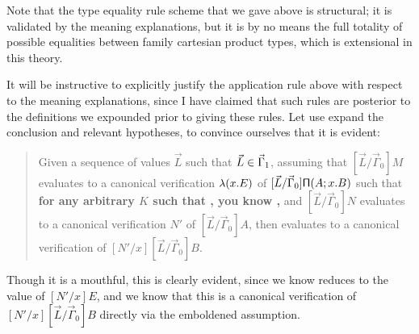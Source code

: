 \documentclass[main.tex]{subfiles}
\begin{document}
Note that the type equality rule scheme that we gave above is structural; it is
validated by the meaning explanations, but it is by no means the full totality
of possible equalities between family cartesian product types, which is
extensional in this theory.

It will be instructive to explicitly justify the application rule above with
respect to the meaning explanations, since I have claimed that such rules are
posterior to the definitions we expounded prior to giving these rules. Let use
expand the conclusion and relevant hypotheses, to convince ourselves that it is
evident:

\begin{quote}

  Given a sequence of values $\vec{L}$ such that $\vec{L}\in\vec\Gamma_1$,
  assuming that $[\vec{L}/\vec\Gamma_0]M$ evaluates to a canonical verification
  $\mathsf{\lambda}(x.E)$ of $[\vec{L}/\vec\Gamma_0]\mathsf{\Pi}(A;x.B)$ such that
  \textbf{for any arbitrary $K$ such that
  , you know
  ,} and $[\vec{L}/\vec\Gamma_0]N$
  evaluates to a canonical verification $N'$ of $[\vec{L}/\vec\Gamma_0]A$, then
   evaluates to a canonical verification of
  $[N'/x][\vec{L}/\vec\Gamma_0]B$.

\end{quote}

Though it is a mouthful, this is clearly evident, since we know
 reduces to the value of $[N'/x]E$, and we know that this is
a canonical verification of $[N'/x][\vec{L}/\vec\Gamma_0]B$ directly via the
emboldened assumption.
\end{document}
